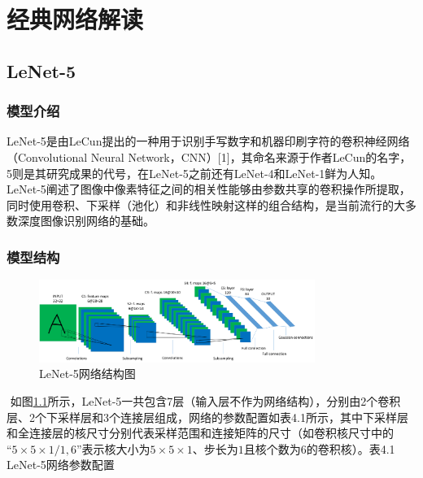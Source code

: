 \chapter{经典网络解读}
\label{ux7b2cux56dbux7ae0-ux7ecfux5178ux7f51ux7edcux89e3ux8bfb}

\section{LeNet-5}
\label{lenet-5}
\subsection{模型介绍}
\label{ux6a21ux578bux4ecbux7ecd}
​ LeNet-5是由LeCun提出的一种用于识别手写数字和机器印刷字符的卷积神经网络（Convolutional Neural Network，CNN）[1]，其命名来源于作者LeCun的名字，5则是其研究成果的代号，在LeNet-5之前还有LeNet-4和LeNet-1鲜为人知。
LeNet-5阐述了图像中像素特征之间的相关性能够由参数共享的卷积操作所提取，同时使用卷积、下采样（池化）和非线性映射这样的组合结构，是当前流行的大多数深度图像识别网络的基础。

\subsection{模型结构}
\label{ux6a21ux578bux7ed3ux6784}

\begin{figure}
  \label{fig:4.1}
\centering
\includegraphics[width=0.8\textwidth]{./img/ch4/image1.png}
\caption{LeNet-5网络结构图}
\end{figure}
​
如图\ref{fig:4.1}所示，LeNet-5一共包含7层（输入层不作为网络结构），分别由2个卷积层、2个下采样层和3个连接层组成，网络的参数配置如表4.1所示，其中下采样层和全连接层的核尺寸分别代表采样范围和连接矩阵的尺寸（如卷积核尺寸中的\(“5\times5\times1/1,6”\)表示核大小为\(5\times5\times1\)、步长为\(1​\)且核个数为6的卷积核）。
​ 表4.1 LeNet-5网络参数配置

